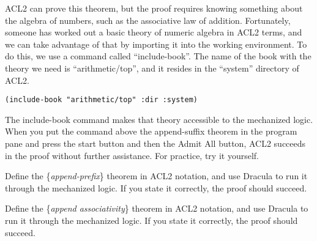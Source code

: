 ACL2 can prove this theorem, but the proof requires knowing 
something about the algebra of numbers, such as the associative law of addition. 
Fortunately, someone has worked out a basic theory of numeric algebra in ACL2 terms, 
and we can take advantage of that by importing it into the working environment. 
To do this, we use a command called ``include-book''. 
The name of the book with the theory we need is ``arithmetic/top'', 
and it resides in the ``system'' directory of ACL2.

\begin{lstlisting}
(include-book "arithmetic/top" :dir :system)
\end{lstlisting}

The include-book command makes that theory accessible to the mechanized logic. When you put the command above the append-suffix theorem in the program pane and press the start button and then the Admit All button, ACL2 succeeds in the proof without further assistance. For practice, try it yourself.

\begin{ExerciseList}
\Exercise Define the \{\emph{append-prefix}\} theorem in ACL2 notation, and use Dracula to run it through the mechanized logic. If you state it correctly, the proof should succeed.

\Exercise Define the \{\emph{append associativity}\} theorem in ACL2 notation, and use Dracula to run it through the mechanized logic. If you state it correctly, the proof should succeed.
\end{ExerciseList}


